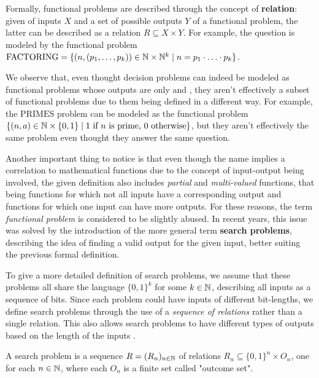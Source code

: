 Formally, functional problems are described through the concept of \textbf{relation}: given of inputs $X$ and a set of possible outputs $Y$ of a functional problem, the latter can be described as a relation $R \subseteq X \times Y$. For example, the question  is modeled by the functional problem $\mathrm{FACTORING} = \{(n, (p_1, \ldots, p_k)) \in \mathbb{N} \times \mathbb{N}^k \mid n = p_1 \cdot \ldots \cdot p_k\}$.

We observe that, even thought decision problems can indeed be modeled as functional problems whose outputs are only  and , they aren't effectively a subset of functional problems due to them being defined in a different way. For example, the $\mathrm{PRIMES}$ problem can be modeled as the functional problem $\{(n, a) \in \mathbb{N} \times \{0,1\} \mid 1 \text{ if } n \text{ is prime, } 0 \text{ otherwise}\}$, but they aren't effectively the same problem even thought they answer the same question.

Another important thing to notice is that even though the name implies a correlation to mathematical functions due to the concept of input-output being involved, the given definition also includes \textit{partial} and \textit{multi-valued} functions, that being functions for which not all inputs have a corresponding output and functions for which one input can have more outputs. For these reasons, the term \textit{functional problem} is considered to be slightly abused. In recent years, this issue was solved by the introduction of the more general term \textbf{search problems}, describing the idea of finding a valid output for the given input, better suiting the previous formal definition.

To give a more detailed definition of search problems, we assume that these problems all share the language $\{0,1\}^k$ for some $k \in \mathbb{N}$, describing all inputs as a sequence of bits. Since each problem could have inputs of different bit-lengths, we define search problems through the use of a \textit{sequence of relations} rather than a single relation. This also allows search problems to have different types of outputs based on the length of the inputs \cite{search_problems_dt_model, rel_comp_np_search, proofs_circuits_communication, tfnp_characterization}. 

\begin{definition}
    A search problem is a sequence $R = (R_n)_{n \in \mathbb{N}}$ of relations $R_n \subseteq \{0,1\}^n \times O_n$, one for each $n \in \mathbb{N}$, where each $O_n$ is a finite set called "outcome set".
\end{definition}

